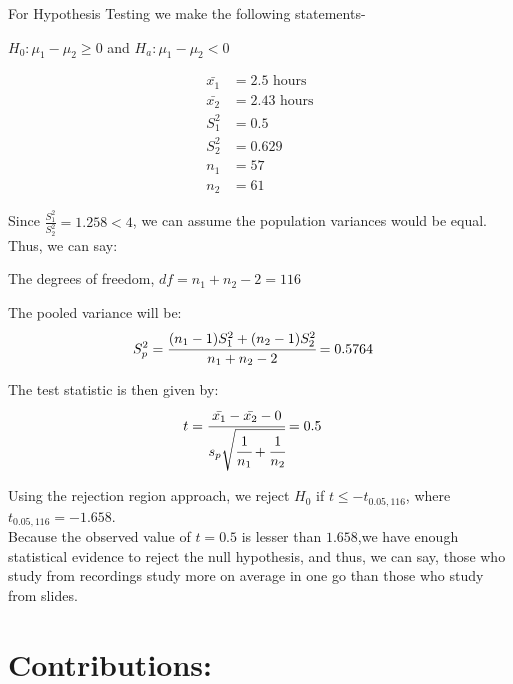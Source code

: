 \documentclass[12pt,onecolumn,letterpaper]{article}
\begin{document}
For Hypothesis Testing we make the following statements-
\begin{center}
    $ H_0 : \mu_1 - \mu_2 \geq 0$ and $H_a : \mu_1 - \mu_2 < 0$  \\
\end{center}

\begin{align}
    \bar{x_1} &= 2.5 \text{ hours}\\ 
    \bar{x_2} &= 2.43 \text{ hours} \\ 
    S^2_1 &= 0.5\\
    S^2_2 &= 0.629\\
    n_1 &= 57\\
    n_2 &= 61
\end{align}

Since $\frac{S_1^2}{S_2^2} = 1.258 < 4$, we can assume the population variances would be equal. Thus, we can say: \par The degrees of freedom, $df = n_1 + n_2 -2 = 116$

 The pooled variance will be:
 \begin{align}
     S_p^2 &= \cfrac{(n_1-1)S_1^2 + (n_2-1)S_2^2}{n_1+n_2-2} = 0.5764
 \end{align}
      

The test statistic is then given by:
 \begin{align}
      t &= \cfrac{\bar{x_1} - \bar{x_2} - 0}{s_p\sqrt{\cfrac{1}{n_1} + \cfrac{1}{n_2}}} = 0.5
 \end{align}

 \par
 Using the rejection region approach, we reject $H_0$ if $t \leq -t_{0.05, 116}$, where $t_{0.05,116} = -1.658$.\\ 
 Because the observed value of $t=0.5$ is lesser than $1.658$,we have enough statistical evidence to reject the null hypothesis, and thus, we can say, those who study from recordings study more on average in one go than those who study from slides.

\newpage


\section {Contributions:}
\end{document}
